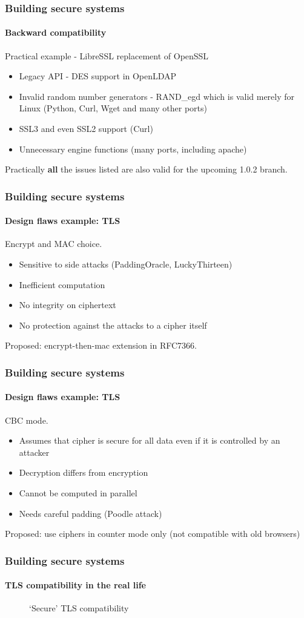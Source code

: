 \documentclass[12pt,t]{beamer}
\newcommand{\funcname}[1]{
	{\color{yellow!30} #1}
}
\newcommand{\cipher}[1]{
	{\color{blue!30} #1}
}
\begin{document}
\begin{frame}
\frametitle{Building secure systems}
\framesubtitle{Backward compatibility}
Practical example - LibreSSL replacement of OpenSSL
\begin{itemize}
\item Legacy API - \cipher{DES} support in OpenLDAP
\item Invalid random number generators - \funcname{RAND\_egd} which is valid merely for Linux (Python, Curl, Wget and many other ports)
\item SSL3 and even SSL2 support (Curl)
\item Unnecessary engine functions (many ports, including apache) 
\end{itemize}

Practically \textbf{all} the issues listed are also valid for the upcoming 1.0.2 branch.
\end{frame}

\begin{frame}
\frametitle{Building secure systems}
\framesubtitle{Design flaws example: TLS}
Encrypt and MAC choice.
\begin{itemize}
\item Sensitive to side attacks (PaddingOracle, LuckyThirteen)
\item Inefficient computation
\item No integrity on ciphertext
\item No protection against the attacks to a cipher itself
\end{itemize}
Proposed: encrypt-then-mac extension in RFC7366.
\end{frame}

\begin{frame}
\frametitle{Building secure systems}
\framesubtitle{Design flaws example: TLS}
CBC mode.
\begin{itemize}
\item Assumes that cipher is secure for all data even if it is controlled by an attacker
\item Decryption differs from encryption
\item Cannot be computed in parallel
\item Needs careful padding (Poodle attack)
\end{itemize}
Proposed: use ciphers in counter mode only (not compatible with old browsers)
\end{frame}

\begin{frame}
\frametitle{Building secure systems}
\framesubtitle{TLS compatibility in the real life}
\begin{figure}[H]
\caption{`Secure' TLS compatibility}
\end{figure}
\end{frame}
\end{document}
